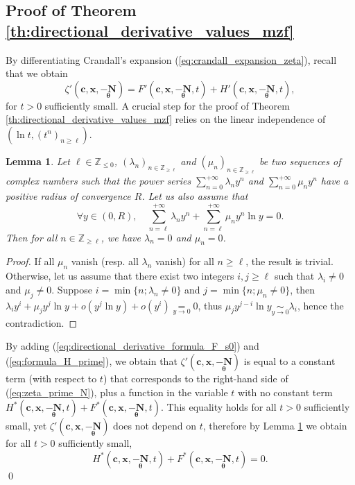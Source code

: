 \documentclass[a4paper]{amsart}
\newtheorem{lemma}[theorem]{Lemma}
\theoremstyle{remark}
\theoremstyle{definition}
\begin{document}
\subsection{Proof of Theorem \ref{th:directional_derivative_values_mzf}}
\label{subsection:proof_theorem_derivative_value}

By differentiating Crandall's expansion (\ref{eq:crandall_expansion_zeta}), recall that we obtain
$$ \zeta'(\mathbf{c},\mathbf{x},\underset{\bm{\theta}}{-\mathbf{N}})=F'(\mathbf{c},\mathbf{x},\underset{\bm{\theta}}{-\mathbf{N}},t) + H'(\mathbf{c},\mathbf{x},\underset{\bm{\theta}}{-\mathbf{N}},t), $$
for $t>0$ sufficiently small. A crucial step for the proof of Theorem \ref{th:directional_derivative_values_mzf} relies on the linear independence of $(\ln t,(t^n)_{n \geq \ell})$.

\begin{lemma}
\label{lem:linear_independence_laurent_series}
Let $\ell \in \mathbb{Z}_{\leq 0}$, $(\lambda_n)_{n \in \mathbb{Z}_{\geq \ell}}$ and $(\mu_n)_{n \in \mathbb{Z}_{\geq \ell}}$ be two sequences of complex numbers such that the power series $\sum_{n=0}^{+\infty} \lambda_n y^n$ and $\sum_{n=0}^{+\infty}\mu_n y^n$ have a positive radius of convergence $R$. Let us also assume that
$$ \forall y \in (0,R), \quad \sum_{n=\ell}^{+\infty} \lambda_n y^n + \sum_{n=\ell}^{+\infty} \mu_n y^{n} \ln y = 0. $$
Then for all $n \in \mathbb{Z}_{\geq \ell}$, we have $\lambda_n=0$ and $\mu_n=0$.
\end{lemma}

\begin{proof}
If all $\mu_n$ vanish (resp. all $\lambda_n$ vanish) for all $n \geq \ell$, the result is trivial. Otherwise, let us assume that there exist two integers $i, j \geq \ell$ such that $\lambda_i \neq 0$ and $\mu_j \neq 0$. Suppose $i = \min \{n; \lambda_n \neq 0 \}$ and $j = \min \{n; \mu_n \neq 0 \}$, then $\lambda_i y^i+\mu_j y^j \ln y + o(y^j\ln y)+o(y^i)\underset{y \to 0}{=}0$, thus $\mu_j y^{j-i}\ln y \underset{y \to 0}{\sim} \lambda_i$, hence the contradiction.
\end{proof}

By adding (\ref{eq:directional_derivative_formula_F_s0}) and (\ref{eq:formula_H_prime}), we obtain that $\zeta'(\mathbf{c},\mathbf{x},\underset{\bm{\theta}}{-\mathbf{N}})$ is equal to a constant term (with respect to $t$) that corresponds to the right-hand side of (\ref{eq:zeta_prime_N}), plus a function in the variable $t$ with no constant term $H^*(\mathbf{c},\mathbf{x},\underset{\bm{\theta}}{-\mathbf{N}},t)+F^*(\mathbf{c},\mathbf{x},\underset{\bm{\theta}}{-\mathbf{N}},t)$. This equality holds for all $t>0$ sufficiently small, yet $\zeta'(\mathbf{c},\mathbf{x},\underset{\bm{\theta}}{-\mathbf{N}})$ does not depend on $t$, therefore by Lemma \ref{lem:linear_independence_laurent_series} we obtain for all $t>0$ sufficiently small,
$$ H^*(\mathbf{c},\mathbf{x},\underset{\bm{\theta}}{-\mathbf{N}},t)+F^*(\mathbf{c},\mathbf{x},\underset{\bm{\theta}}{-\mathbf{N}},t)=0. $$
\qed
\end{document}
